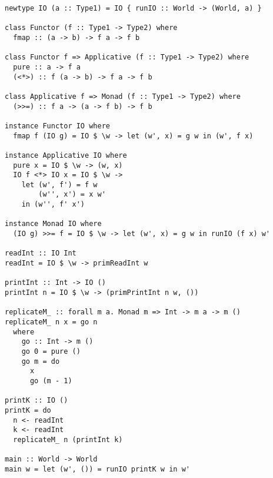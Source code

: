 \documentclass[runningheads]{llncs}
\begin{document}
\begin{verbatim}
newtype IO (a :: Type1) = IO { runIO :: World -> (World, a) }

class Functor (f :: Type1 -> Type2) where
  fmap :: (a -> b) -> f a -> f b

class Functor f => Applicative (f :: Type1 -> Type2) where
  pure :: a -> f a
  (<*>) :: f (a -> b) -> f a -> f b

class Applicative f => Monad (f :: Type1 -> Type2) where
  (>>=) :: f a -> (a -> f b) -> f b

instance Functor IO where
  fmap f (IO g) = IO $ \w -> let (w', x) = g w in (w', f x)

instance Applicative IO where
  pure x = IO $ \w -> (w, x)
  IO f <*> IO x = IO $ \w ->
    let (w', f') = f w
        (w'', x') = x w'
    in (w'', f' x')

instance Monad IO where
  (IO g) >>= f = IO $ \w -> let (w', x) = g w in runIO (f x) w'

readInt :: IO Int
readInt = IO $ \w -> primReadInt w

printInt :: Int -> IO ()
printInt n = IO $ \w -> (primPrintInt n w, ())

replicateM_ :: forall m a. Monad m => Int -> m a -> m ()
replicateM_ n x = go n
  where
    go :: Int -> m ()
    go 0 = pure ()
    go m = do
      x
      go (m - 1)

printK :: IO ()
printK = do
  n <- readInt
  k <- readInt
  replicateM_ n (printInt k)

main :: World -> World
main w = let (w', ()) = runIO printK w in w'
\end{verbatim}
\end{document}
